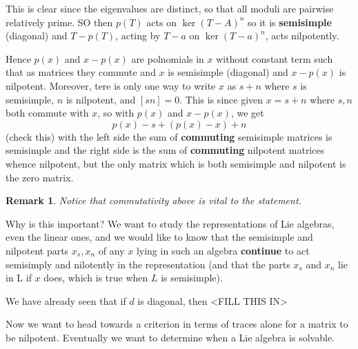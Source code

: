 \documentclass[12pt]{article}
\theoremstyle{nonumberbreak}
\theoremstyle{changebreak}
\theoremstyle{nonumberbreak}
\theoremstyle{change}
\newtheorem{rmk}[thm]{Remark}
\begin{document}
This is clear since the eigenvalues are distinct, so that all moduli are pairwise relatively prime.
SO then $p(T)$ acts on $\ker(T-A)^n$ so it is \textbf{semisimple} (diagonal) and $T-p(T)$, acting by $T-a$ on
$\ker(T-a)^n$, acts nilpotently.

Hence $p(x)$ and $x-p(x)$ are polnomials in $x$ without constant term such that as matrices they commute
and $x$ is semisimple (diagonal) and $x-p(x)$ is nilpotent. Moreover, tere is only one way to write $x$ as $s+n$ where $s$ is semisimple, $n$ is nilpotent, and $[sn]=0$.
This is since given $x=s+n$ where $s,n$ both commute with $x$, so with $p(x)$ and $x-p(x)$, we get
\[p(x)-s+(p(x)-x)+n\]
(check this) with the left side the sum of \textbf{commuting} semisimple matrices is semisimple and
the right side is the sum of \textbf{commuting} nilpotent matrices whence nilpotent, but the only matrix
which is both semisimple and nilpotent is the zero matrix.
\begin{rmk}
	Notice that commutativity above is vital to the statement.
\end{rmk}

Why is this important? We want to study the representations of Lie algebras, even the linear ones, and we would like to know that the semisimple and nilpotent parts $x_s, x_n$ of
any $x$ lying in such an algebra \textbf{continue} to act semisimply and nilotently in the representation 
(and that the parts $x_s$ and $x_n$ lie in L if $x$ does, which is true when $L$ is semisimple).

We have already seen that if $d$ is diagonal, then 
<FILL THIS IN>

Now we want to head towards a criterion in terms of traces alone for a matrix to be nilpotent.
Eventually we want to determine when a Lie algebra is solvable.
\end{document}
